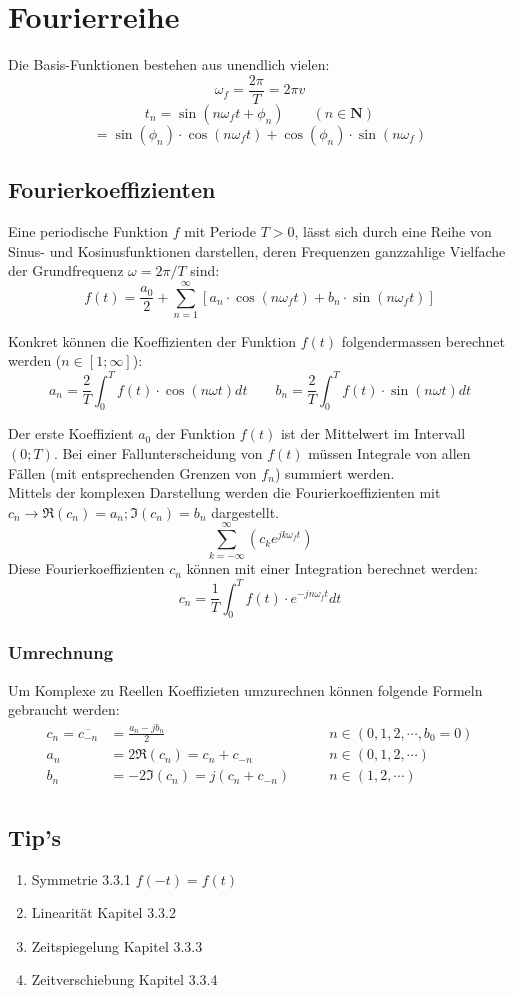 \section{Fourierreihe}
Die Basis-Funktionen bestehen aus unendlich vielen:
\[\omega_f = \frac{2\pi}{T} = 2\pi v\]
\[
t_n = \sin(n\omega_f t + \phi_n) \qquad (n \in \mathbf{N})
\]
\[
= \sin(\phi_n) \cdot \cos(n\omega_f t) + \cos(\phi_n)\cdot \sin(n\omega_f)
\]

\subsection{Fourierkoeffizienten}
Eine periodische Funktion $f$ mit Periode $T > 0$, lässt sich durch eine Reihe von Sinus- und Kosinusfunktionen darstellen,
deren Frequenzen ganzzahlige Vielfache der Grundfrequenz $\omega = 2\pi/T$ sind:
\[f(t) = \frac{a_0}{2} + \sum_{n = 1}^{\infty}[a_n \cdot \cos(n\omega_ft) + b_n \cdot \sin(n\omega_ft)]\]

\noindent Konkret können die Koeffizienten der Funktion $f(t)$ folgendermassen berechnet werden ($n \in [1;\infty]$):
\[
a_n = \frac{2}{T}\int_{0}^{T}f(t) \cdot \cos(n\omega t)dt \qquad b_n = \frac{2}{T}\int_{0}^{T}f(t) \cdot \sin(n\omega t)dt
\]

\noindent Der erste Koeffizient $a_0$ der Funktion $f(t)$ ist der Mittelwert im Intervall $(0; T)$. Bei einer Fallunterscheidung von $f(t)$ müssen Integrale von allen Fällen (mit entsprechenden Grenzen von $f_n$) summiert werden.
~\\

\noindent Mittels der komplexen Darstellung werden die Fourierkoeffizienten mit $c_n \rightarrow \Re(c_n) = a_n; \Im(c_n) = b_n$ dargestellt.
\[
\sum_{k=-\infty}^{\infty}\left(c_ke^{jk\omega_f t}\right)
\]
Diese Fourierkoeffizienten $c_n$ können mit einer Integration berechnet werden:
\[
c_n = \frac{1}{T} \int_{0}^{T}f(t)\cdot e^{-jn\omega_f t} dt
\]

\subsubsection{Umrechnung}\label{umrechnung}
Um Komplexe zu Reellen Koeffizieten umzurechnen können folgende Formeln gebraucht werden:
\begin{align*}
	c_n = \overline{c_{-n}} &= \frac{a_n - jb_n}{2} &\qquad n \in (0,1,2, \cdots, b_0 = 0) \\
	a_n &= 2\Re(c_n) = c_n + c_{-n}  &\qquad n \in (0,1,2, \cdots) \\
	b_n &= -2\Im(c_n) = j(c_n + c_{-n}) &\qquad n \in (1,2, \cdots) \\
\end{align*}

\subsection{Tip's}
\begin{enumerate}[nosep]
	\item Symmetrie 3.3.1 $f(-t) = f(t)$
	\item Linearität Kapitel 3.3.2
	\item Zeitspiegelung Kapitel 3.3.3
	\item Zeitverschiebung Kapitel 3.3.4
\end{enumerate}
